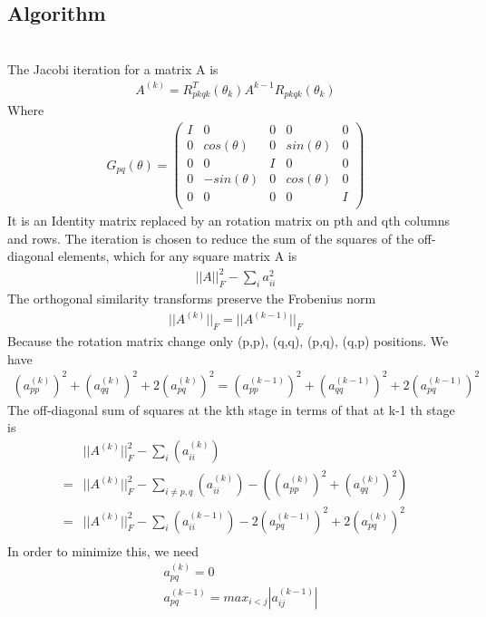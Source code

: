\documentclass[a4paper]{article}
\begin{document}
\subsection{Algorithm}\\
The Jacobi iteration for a matrix A is
\begin{align*}
	A^{(k)} = R^T_{pkqk}(\theta_k) A^{k-1} R_{pkqk} (\theta_k)
\end{align*}
Where
\begin{align*}
	G_{pq}(\theta)
	= 
	\left( \begin{array}{ccccc}
I      & 	0 	& 	0 	 & 	 0 		& 	0 	\\
0	   & 	cos(\theta) 	& 	0 	 &	 sin(\theta) 		& 	0	\\
0 	   &    0   &   I  	 &   0		&	0	\\
0 	   &    -sin(\theta)   &   0    &   cos(\theta)		& 	0	\\
0      &    0   &   0    & 	 0   	& 	I	\\\end{array} \right)
\end{align*}
It is an Identity matrix replaced by an rotation matrix on pth and qth columns and rows. The iteration is chosen to reduce the sum of the squares of the off-diagonal elements, which for any square matrix A is
\begin{align*}
	||A||_F^2 - \sum_i a_{ii}^2
\end{align*}
The orthogonal similarity transforms preserve the Frobenius norm
\begin{align*}
	|| A^{(k)}||_F = ||A^{(k-1)}||_F
\end{align*}
Because the rotation matrix change only (p,p), (q,q), (p,q), (q,p) positions. We have
\begin{align*}
	(a_{pp}^{(k)})^2 + (a_{qq}^{(k)})^2+ 2 (a_{pq}^{(k)})^2 = (a_{pp}^{(k-1)})^2 + (a_{qq}^{(k-1)})^2 + 2 (a_{pq}^{(k-1)})^2   
\end{align*}
The off-diagonal sum of squares at the kth stage in terms of that at k-1 th stage is
\begin{align*}
	& || A^{(k)}||^2_F - \sum_i (a_{ii}^{(k)}) \\
	= & || A^{(k)}||^2_F - \sum_{i \neq p,q} (a_{ii}^{(k)}) -( (a_{pp}^{(k)})^2 + (a_{qq}^{(k)})^2 ) \\
	= & || A^{(k)}||^2_F - \sum_i (a_{ii}^{(k-1)}) - 2 (a_{pq}^{(k-1)})^2  + 2 (a_{pq}^{(k)})^2  \\
\end{align*}
In order to minimize this, we need
\begin{align*}
	& a_{pq}^{(k)} = 0\\
	& a_{pq}^{(k-1)} = max _{i<j} |a_{ij} ^ {(k-1)}|\\
\end{align*}
\end{document}
